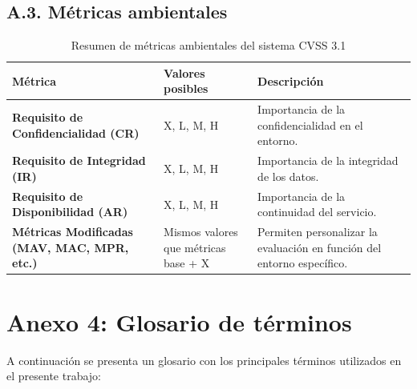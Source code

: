 \documentclass[a4paper, 11pt]{article}
\begin{document}
\vspace{1cm}

\subsection*{A.3. Métricas ambientales}

\begin{table}[H]
\centering
\caption{Resumen de métricas ambientales del sistema CVSS 3.1}
\label{tab:cvss_environmental_metrics}
\begin{tabular}{|p{4.5cm}|p{3.5cm}|p{7cm}|}
\hline
\rowcolor{gray!30}
\textbf{Métrica} & \textbf{Valores posibles} & \textbf{Descripción} \\ \hline
\textbf{Requisito de Confidencialidad (CR)} & X, L, M, H & Importancia de la confidencialidad en el entorno. \\ \hline
\textbf{Requisito de Integridad (IR)} & X, L, M, H & Importancia de la integridad de los datos. \\ \hline
\textbf{Requisito de Disponibilidad (AR)} & X, L, M, H & Importancia de la continuidad del servicio. \\ \hline
\textbf{Métricas Modificadas (MAV, MAC, MPR, etc.)} & Mismos valores que métricas base + X & Permiten personalizar la evaluación en función del entorno específico. \\ \hline
\end{tabular}
\end{table}














\clearpage
\thispagestyle{nohead}

\section*{Anexo 4: Glosario de términos}
\label{anexo:4}

A continuación se presenta un glosario con los principales términos utilizados en el presente trabajo:
\end{document}
